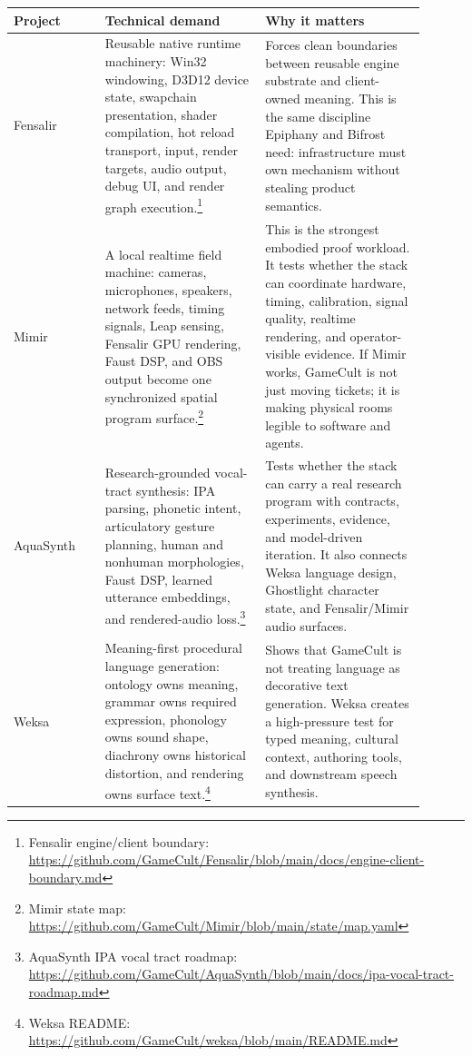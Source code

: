 \documentclass[11pt,oneside]{report}
\newcommand{\src}[2]{\footnote{#1: \url{#2}}}
\begin{document}
\begin{longtable}{P{0.2\linewidth}P{0.35\linewidth}P{0.35\linewidth}}
\toprule
\textbf{Project} & \textbf{Technical demand} & \textbf{Why it matters} \\
\midrule
Fensalir & Reusable native runtime machinery: Win32 windowing, D3D12 device state, swapchain presentation, shader compilation, hot reload transport, input, render targets, audio output, debug UI, and render graph execution.\src{Fensalir engine/client boundary}{https://github.com/GameCult/Fensalir/blob/main/docs/engine-client-boundary.md} & Forces clean boundaries between reusable engine substrate and client-owned meaning. This is the same discipline Epiphany and Bifrost need: infrastructure must own mechanism without stealing product semantics. \\
Mimir & A local realtime field machine: cameras, microphones, speakers, network feeds, timing signals, Leap sensing, Fensalir GPU rendering, Faust DSP, and OBS output become one synchronized spatial program surface.\src{Mimir state map}{https://github.com/GameCult/Mimir/blob/main/state/map.yaml} & This is the strongest embodied proof workload. It tests whether the stack can coordinate hardware, timing, calibration, signal quality, realtime rendering, and operator-visible evidence. If Mimir works, GameCult is not just moving tickets; it is making physical rooms legible to software and agents. \\
AquaSynth & Research-grounded vocal-tract synthesis: IPA parsing, phonetic intent, articulatory gesture planning, human and nonhuman morphologies, Faust DSP, learned utterance embeddings, and rendered-audio loss.\src{AquaSynth IPA vocal tract roadmap}{https://github.com/GameCult/AquaSynth/blob/main/docs/ipa-vocal-tract-roadmap.md} & Tests whether the stack can carry a real research program with contracts, experiments, evidence, and model-driven iteration. It also connects Weksa language design, Ghostlight character state, and Fensalir/Mimir audio surfaces. \\
Weksa & Meaning-first procedural language generation: ontology owns meaning, grammar owns required expression, phonology owns sound shape, diachrony owns historical distortion, and rendering owns surface text.\src{Weksa README}{https://github.com/GameCult/weksa/blob/main/README.md} & Shows that GameCult is not treating language as decorative text generation. Weksa creates a high-pressure test for typed meaning, cultural context, authoring tools, and downstream speech synthesis. \\

\end{longtable}
\end{document}
